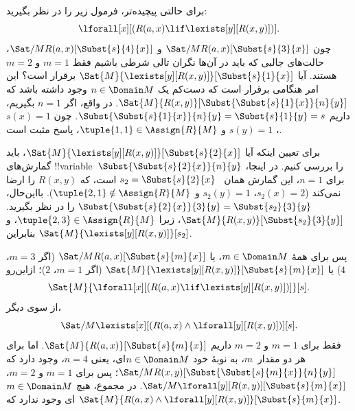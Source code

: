 \documentclass[../../../include/open-logic-section]{subfiles}
\begin{document}
\begin{ex}

برای حالتی پیچیده‌تر، فرمول زیر را در نظر بگیرید:
\[
\lforall[x][(R(a,x) \lif \lexists[y][R(x,y)])].
\]
چون $\Sat/{M}{R(a,x)}[\Subst{s}{3}{x}]$ و
$\Sat/{M}{R(a,x)}[\Subst{s}{4}{x}]$، حالت‌های جالبی که باید در آن‌ها
نگران تالی شرطی باشیم فقط $m = 1$ و $m = 2$ هستند. آیا
$\Sat{M}{\lexists[y][R(x,y)]}[\Subst{s}{1}{x}]$ برقرار است؟ این امر
هنگامی برقرار است که دست‌کم یک $n \in \Domain M$ وجود داشته باشد که
$\Sat{M}{R(x,y)}[\Subst{\Subst{s}{1}{x}}{n}{y}]$. در واقع، اگر
$n = 1$ بگیریم، داریم $\Subst{\Subst{s}{1}{x}}{n}{y} =
\Subst{s}{1}{y} = s$. چون $s(x) = 1$، $s(y) = 1$ و
$\tuple{1,1} \in \Assign{R}{M}$، پاسخ مثبت است.

برای تعیین اینکه آیا $\Sat{M}{\lexists[y][R(x,y)]}[\Subst{s}{2}{x}]$،
باید گمارش‌های !!{variable}~$\Subst{\Subst{s}{2}{x}}{n}{y}$ را بررسی
کنیم. در اینجا، برای $n = 1$، این گمارش همان
~$s_2 = \Subst{s}{2}{x}$ است، که $R(x,y)$ را ارضا نمی‌کند ($s_2(x) =
2$، $s_2(y) = 1$ و $\tuple{2,1}\notin \Assign{R}{M}$). بااین‌حال،
$\Subst{\Subst{s}{2}{x}}{3}{y} = \Subst{s_2}{3}{y}$ را در نظر بگیرید.
$\Sat{M}{R(x,y)}[\Subst{s_2}{3}{y}]$، زیرا $\tuple{2,3} \in
\Assign{R}{M}$، و بنابراین $\Sat{M}{\lexists[y][R(x,y)]}[s_2]$.

پس برای همهٔ $m \in \Domain M$، یا
$\Sat/{M}{R(a,x)}[\Subst{s}{m}{x}]$ (اگر $m = 3$، $4$) یا
$\Sat{M}{\lexists[y][R(x,y)]}[\Subst{s}{m}{x}]$ (اگر $m = 1$، $2$)؛
ازاین‌رو
\[
\Sat{M}{\lforall[x][(R(a,x) \lif \lexists[y][R(x,y)])]}[s].
\]
از سوی دیگر،
\[
\Sat/{M}{\lexists[x][(R(a,x) \land \lforall[y][R(x,y)])]}[s].
\]
فقط برای $m = 1$ و $m = 2$ داریم
$\Sat{M}{R(a,x)}[\Subst{s}{m}{x}]$. اما برای هر دو مقدار~$m$، به نوبهٔ
خود $n \in \Domain M$ای، یعنی $n = 4$، وجود دارد که
$\Sat/{M}{R(x,y)}[\Subst{\Subst{s}{m}{x}}{n}{y}]$؛ پس برای
$m = 1$ و $m = 2$،
$\Sat/{M}{\lforall[y][R(x,y)]}[\Subst{s}{m}{x}]$. در مجموع، هیچ
$m \in \Domain M$ای وجود ندارد که $\Sat{M}{R(a,x)
\land \lforall[y][R(x,y)]}[\Subst{s}{m}{x}]$.
\end{ex}
\end{document}
